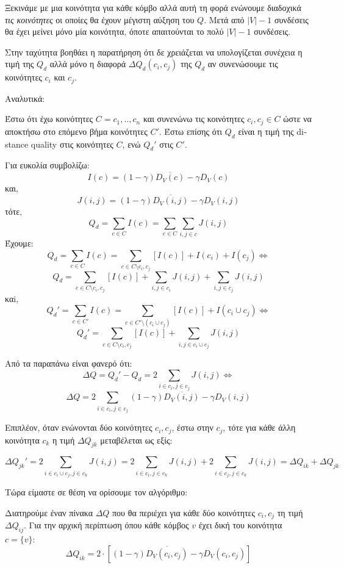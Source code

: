 \documentclass[10pt, letterpaper]{article}
\begin{document}
Ξεκινάμε με μια κοινότητα για κάθε κόμβο αλλά αυτή τη φορά ενώνουμε διαδοχικά \emph{τις κοινότητες} οι οποίες θα έχουν μέγιστη αύξηση του $Q$. Μετά από $|V|-1$ συνδέσεις
θα έχει μείνει μόνο μία κοινότητα, όποτε απαιτούνται το πολύ $|V|-1$ συνδέσεις. 

Στην ταχύτητα βοηθάει η παρατήρηση ότι δε χρειάζεται να υπολογίζεται συνέχεια η τιμή της $Q_d$ αλλά μόνο η διαφορά $\Delta Q_d(c_i,c_j)$ της $Q_d$ αν συνενώσουμε τις 
κοινότητες $c_i$ και $c_j$. 


Αναλυτικά:

Έστω ότι έχω κοινότητες $C = {c_1,..,c_n}$ και συνενώνω τις κοινότητες $c_i,c_j \in C$ ώστε να αποκτήσω
στο επόμενο βήμα κοινότητες $C'$. Έστω επίσης ότι $Q_d$ είναι η τιμή της \textlatin{distance quality}
στις κοινότητες $C$, ενώ $Q_d'$ στις $C'$. 



Για ευκολία συμβολίζω: 
\[ I(c) = (1 - \gamma)\overline{ D_V(c) } - \gamma D_V(c) \]
και,
\[ J(i,j) = (1-\gamma) \overline{ D_V(i,j)} - \gamma D_V(i,j) \]
τότε,
\[ Q_d = \sum_{c \in C} I(c) =\sum_{c \in C} \sum_{i,j \in c} J(i,j) \]
Έχουμε:
\[ Q_d  = \sum_{c \in C} I(c) =  \sum_{c \in C \setminus c_i,c_j}[I(c)] + I(c_i) + I(c_j) \Leftrightarrow\]
\[ Q_d = \sum_{c \in C \setminus c_i,c_j}[I(c)] + \sum_{i,j \in c_i}J(i,j) + \sum_{i,j \in c_j}J(i,j)  \]
καi,
\[ Q_d' = \sum_{c \in C'} I(c) =  \sum_{c \in C' \setminus (c_i \cup c_j)}[I(c)] + I(c_i \cup c_j) \Leftrightarrow \]
\[ Q_d' =  \sum_{c \in C \setminus c_i,c_j}[I(c)] + \sum_{i,j \in c_i \cup c_j} J(i,j) \]



Από τα παραπάνω είναι φανερό ότι:
\[   \Delta Q = Q_d' - Q_d = 2 \sum_{i \in c_i, j \in c_j} J(i,j) \Leftrightarrow \]
\[ \Delta Q = 2 \sum_{i \in c_i, j \in c_j} (1-\gamma) \overline{ D_V(i,j)} - \gamma D_V(i,j) \]

\bigskip

Επιπλέον, όταν ενώνονται δύο κοινότητες $c_i,c_j$, έστω στην $c_j$, τότε για κάθε 
άλλη κοινότητα $c_k$ η τιμή $\Delta Q_{jk}$ μεταβέλεται ως εξίς:

\[ \Delta Q_{jk}' = 2 \sum_{i \in c_i \cup c_j, j \in c_k} J(i,j) = 2 \sum_{i \in c_i, j \in c_k} J(i,j) + 2 \sum_{i \in c_j, j \in c_k} J(i,j) = \Delta Q_{ik} + \Delta Q_{jk}\]


Τώρα είμαστε σε θέση να ορίσουμε τον αλγόριθμο:

Διατηρούμε έναν πίνακα $\Delta Q$ που θα περιέχει για κάθε δύο κοινότητες $c_i,c_j$ 
τη τιμή $\Delta Q_{ij}$. Για την αρχική περίπτωση όπου κάθε κόμβος $v$ έχει δική του 
κοινότητα $c=\{v\}$: 
\begin{equation}   \label{init_dq}
  \Delta Q_{ik} = 2 \cdot [(1-\gamma)\overline{ D_V(c_i,c_j)} - \gamma  D_V(c_i,c_j)   ]
\end{equation}
\end{document}
